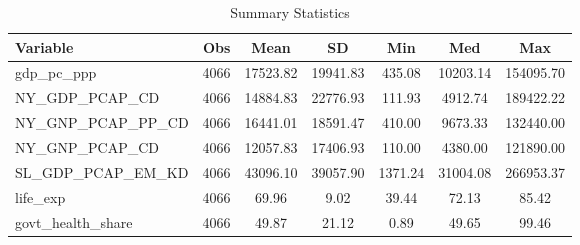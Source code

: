 \begin{table}
\centering
\caption{Summary Statistics}
\label{Sum_Stats}
\begin{tabular}{lcccccc}
\toprule
         Variable &  Obs &     Mean &       SD &     Min &      Med &       Max \\
\midrule
gdp\_pc\_ppp & 4066 & 17523.82 & 19941.83 & 435.08 & 10203.14 & 154095.70 \\
NY\_GDP\_PCAP\_CD & 4066 & 14884.83 & 22776.93 & 111.93 & 4912.74 & 189422.22 \\
NY\_GNP\_PCAP\_PP\_CD & 4066 & 16441.01 & 18591.47 & 410.00 & 9673.33 & 132440.00 \\
NY\_GNP\_PCAP\_CD & 4066 & 12057.83 & 17406.93 & 110.00 & 4380.00 & 121890.00 \\
SL\_GDP\_PCAP\_EM\_KD & 4066 & 43096.10 & 39057.90 & 1371.24 & 31004.08 & 266953.37 \\
life\_exp & 4066 & 69.96 & 9.02 & 39.44 & 72.13 & 85.42 \\
govt\_health\_share & 4066 & 49.87 & 21.12 & 0.89 & 49.65 & 99.46 \\
\bottomrule
\end{tabular}
\end{table}
